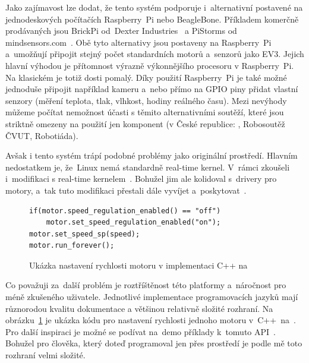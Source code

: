 Jako zajímavost lze dodat, že tento systém podporuje i~alternativní  postavené na jednodeskových počítačích Raspberry~Pi nebo BeagleBone. Příkladem komerčně prodávaných  jsou BrickPi od~Dexter Industries~\cite{lego_dexterindustries_brickpi} a PiStorms od mindsensors.com~\cite{lego_mindsensor_pistorms}.
Obě tyto alternativy jsou postaveny na Raspberry~Pi a~umožňují připojit stejný počet standardních \lego{} motorů a~senzorů jako EV3.
Jejich hlavní výhodou je přítomnost výrazně výkonnějšího procesoru v Raspberry~Pi. Na klasickém  je totiž \evThreeDev{} dosti pomalý. 
Díky použití Raspberry~Pi je také možné jednoduše připojit například kameru a~nebo přímo na GPIO piny přidat vlastní senzory (měření teplota, tlak, vlhkost, hodiny reálného času).  
Mezi nevýhody můžeme počítat nemožnost účasti s těmito alternativními  soutěží, které jsou striktně omezeny na použití jen \lego{} komponent (v České republice: \fll{}, Robosoutěž ČVUT, Robotiáda).

Avšak i tento systém trápí podobné problémy jako originální \lego{} prostředí. 
Hlavním nedostatkem je, že~Linux nemá standardně real-time kernel. 
V~rámci \evThreeDev{} zkoušeli i~modifikaci s real-time kernelem~\cite{legoMindstormsEV3_ev3dev-rt-kernel-start}. 
Bohužel jim ale kolidoval s~drivery pro motory, a~tak tuto modifikaci přestali dále vyvíjet a~poskytovat~\cite{legoMindstormsEV3_ev3dev-rt-kernel-end}.  

\begin{figure}[H] 
	\begin{verbatim}
if(motor.speed_regulation_enabled() == "off")
    motor.set_speed_regulation_enabled("on");
motor.set_speed_sp(speed);
motor.run_forever();
	\end{verbatim}
	\caption{Ukázka nastavení rychlosti motoru v implementaci C++ na \evThreeDev}
	\label{src:ev3dev-lang-cpp_drive-test}
\end{figure}

Co považuji za~další problém je roztříštěnost této platformy a~náročnost pro méně zkušeného uživatele. 
Jednotlivé implementace programovacích jazyků mají různorodou kvalitu dokumentace a většinou relativně složité rozhraní. 
Na obrázku~\ref{src:ev3dev-lang-cpp_drive-test} je ukázka kódu pro nastavení rychlosti jednoho motoru v~C++~na~\evThreeDev{}. 
Pro další inspiraci je možné se podívat na~demo příklady k~tomuto API~\cite{legoMindstormsEV3_ev3dev-lang-cpp_drive-test}.
Bohužel pro člověka, který doteď programoval jen přes \lego{} prostředí je podle mě toto rozhraní velmi složité.

